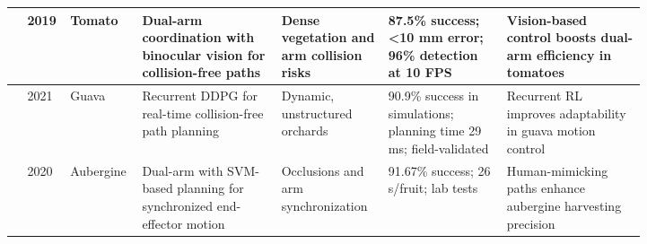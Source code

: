\documentclass[a4paper,fleqn]{cas-dc}
\begin{document}
\begin{table}[htbp]
\begin{tabular}{p{0.025\linewidth} p{0.025\linewidth} p{0.055\linewidth} p{0.2\linewidth} p{0.135\linewidth} p{0.175\linewidth} p{0.2\linewidth}}
\cite{ling2019dual} & 2019 & Tomato & Dual-arm coordination with binocular vision for collision-free paths & Dense vegetation and arm collision risks & 87.5\% success; <10 mm error; 96\% detection at 10 FPS & Vision-based control boosts dual-arm efficiency in tomatoes \\ \midrule
\cite{lin2021collision} & 2021 & Guava & Recurrent DDPG for real-time collision-free path planning & Dynamic, unstructured orchards & 90.9\% success in simulations; planning time 29 ms; field-validated & Recurrent RL improves adaptability in guava motion control \\ \midrule
\cite{sepulveda2020robotic} & 2020 & Aubergine & Dual-arm with SVM-based planning for synchronized end-effector motion & Occlusions and arm synchronization & 91.67\% success; 26 s/fruit; lab tests & Human-mimicking paths enhance aubergine harvesting precision \\ \midrule


\end{tabular}
\end{table}
\end{document}
